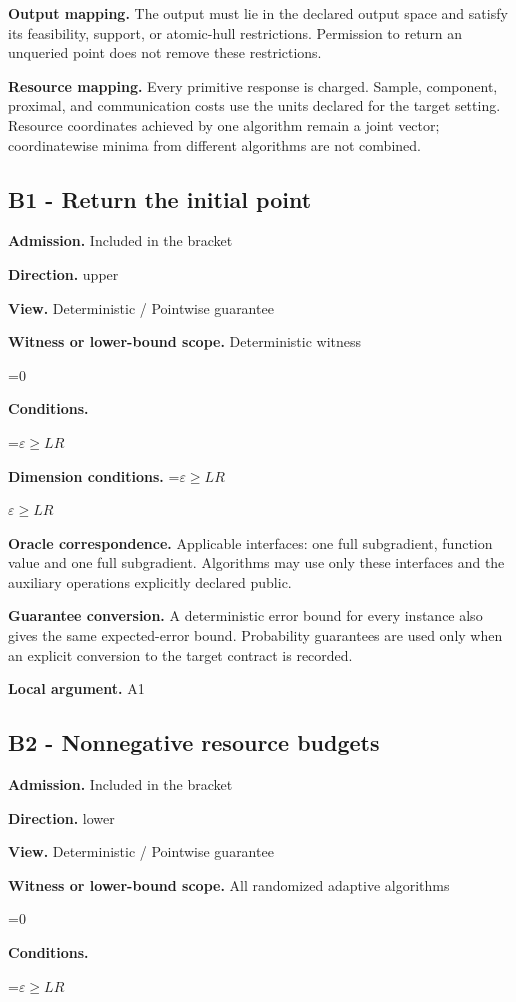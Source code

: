 \documentclass[10pt,a4paper]{article}
\newcommand{\AtlasMath}[1]{\par\begingroup\centering\setbox0=\hbox{$\displaystyle #1$}\ifdim\wd0>1.4\linewidth\typeout{ATLAS WIDE FORMULA: \the\wd0}\fi\ifdim\wd0>\linewidth\resizebox{\linewidth}{!}{\box0}\else\box0\fi\par\endgroup}
\newcommand{\AtlasInlineMath}[1]{\begingroup\setbox0=\hbox{$#1$}\ifdim\wd0>.4\linewidth\endgroup\AtlasMath{#1}\else\endgroup$#1$\fi}
\begin{document}
\textbf{Output mapping.} The output must lie in the declared output space and satisfy its feasibility, support, or atomic-hull restrictions. Permission to return an unqueried point does not remove these restrictions.

\textbf{Resource mapping.} Every primitive response is charged. Sample, component, proximal, and communication costs use the units declared for the target setting. Resource coordinates achieved by one algorithm remain a joint vector; coordinatewise minima from different algorithms are not combined.

\subsection{B1 - Return the initial point}
\textbf{Admission.} Included in the bracket

\textbf{Direction.} upper

\textbf{View.} Deterministic / Pointwise guarantee

\textbf{Witness or lower-bound scope.} Deterministic witness

\AtlasMath{0}
\textbf{Conditions.} 
\AtlasMath{\varepsilon\ge LR}


\textbf{Dimension conditions.} \AtlasInlineMath{\varepsilon\ge LR}

\textbf{Oracle correspondence.} Applicable interfaces: one full subgradient, function value and one full subgradient. Algorithms may use only these interfaces and the auxiliary operations explicitly declared public.

\textbf{Guarantee conversion.} A deterministic error bound for every instance also gives the same expected-error bound. Probability guarantees are used only when an explicit conversion to the target contract is recorded.

\textbf{Local argument.} A1

\subsection{B2 - Nonnegative resource budgets}
\textbf{Admission.} Included in the bracket

\textbf{Direction.} lower

\textbf{View.} Deterministic / Pointwise guarantee

\textbf{Witness or lower-bound scope.} All randomized adaptive algorithms

\AtlasMath{0}
\textbf{Conditions.} 
\AtlasMath{\varepsilon\ge LR}
\end{document}
